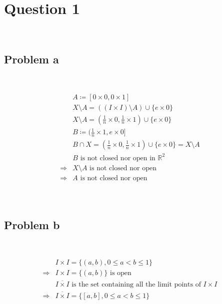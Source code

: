 \documentclass{article}
\begin{document}
\section*{Question 1}

~

\subsection*{Problem a}

~

\begin{equation*}
    \begin{split}
        &A\coloneqq[0\times0,0\times1]\\
        &X\setminus A=((I\times I)\setminus A)\cup \{e\times0\}\\
        &X\setminus A=(\frac{1}{n}\times 0,\frac{1}{n}\times1)\cup\{e\times0\}\\
        &B\coloneqq(\frac{1}{n}\times1,e\times0]\\
        &B\cap X=(\frac{1}{n}\times 0,\frac{1}{n}\times1)\cup\{e\times0\}=X\setminus A\\
        &B\text{ is not closed nor open in }\mathbb{R}^2 \\
        \Rightarrow&X\setminus A\text{ is not closed nor open}\\
        \Rightarrow&A\text{ is not closed nor open}\\
    \end{split}
\end{equation*}

~

\subsection*{Problem b}

~

\begin{equation*}
    \begin{split}
        &I\times I=\{(a,b),0\leqslant a< b\leqslant 1\}\\
        \Rightarrow&I\times I=\{(a,b)\}\text{ is open}\\
        &\overline{I\times I}\text{ is the set containing all the limit points of }I\times I\\
        \Rightarrow&\overline{I\times I}=\{[a,b],0\leqslant a< b\leqslant 1\}\\
    \end{split}
\end{equation*}
\end{document}
